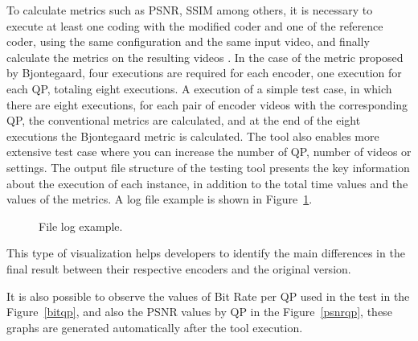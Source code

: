\documentclass[journal]{IEEEtran}
\begin{document}
To calculate metrics such as PSNR, SSIM among others, it is necessary to execute at least one coding with the modified coder and one of the reference coder, using the same configuration and the same input video, and finally calculate the metrics on the resulting videos . In the case of the metric proposed by Bjontegaard, four executions are required for each encoder, one execution for each QP, totaling eight executions. A execution of a simple test case, in which there are eight executions, for each pair of encoder videos with the corresponding QP, the conventional metrics are calculated, and at the end of the eight executions the Bjontegaard metric is calculated. The tool also enables more extensive test case where you can increase the number of QP, number of videos or settings. The output file structure of the testing tool presents the key information about the execution of each instance, in addition to the total time values and the values of the metrics. A log file example is shown in Figure~\ref{fig:log}.

\FloatBarrier

\begin{figure}[!ht]
	\centering
	\caption{File log example.}
	\label{fig:log}
\end{figure}

\FloatBarrier

This type of visualization helps developers to identify the main differences in the final result between their respective encoders and the original version.

It is also possible to observe the values of Bit Rate per QP used in the test in the Figure~\ref{bitqp}, and also the PSNR values by QP in the Figure~\ref{psnrqp}, these graphs are generated automatically after the tool execution.
\end{document}

